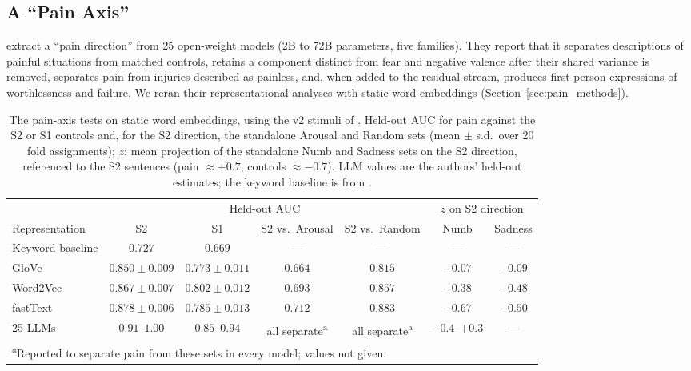 \documentclass[11pt]{article}
\begin{document}
\subsection{A ``Pain Axis''}
\label{sec:pain}

\citet{tagliabue2026pain} extract a ``pain direction'' from 25 open-weight models (2B to
72B parameters, five families). They report that it separates descriptions of painful
situations from matched controls, retains a component distinct from fear and negative valence
after their shared variance is removed, separates pain from injuries described as painless,
and, when added to the residual stream, produces first-person expressions of worthlessness
and failure. We reran their representational analyses with static word
embeddings (Section~\ref{sec:pain_methods}).

\begin{table}[t]
  \centering
  \caption{The pain-axis tests on static word embeddings, using the v2 stimuli of
  \citet{tagliabue2026pain}. Held-out AUC for pain against the S2 or S1
  controls and, for the S2 direction, the standalone Arousal and Random sets (mean $\pm$ s.d.\ over 20 fold assignments);
  $z$: mean projection of the standalone Numb and Sadness sets on the S2 direction,
  referenced to the S2 sentences (pain $\approx +0.7$, controls $\approx -0.7$). LLM values are the
  authors' held-out estimates; the keyword baseline is from \citet{painreview2026}.}
  \label{tab:pain}
  \small
  \begin{tabular}{lcccccc}
    \toprule
    & \multicolumn{4}{c}{Held-out AUC} & \multicolumn{2}{c}{$z$ on S2 direction} \\
    \cmidrule(lr){2-5} \cmidrule(lr){6-7}
    Representation & S2 & S1 & S2 vs.\ Arousal & S2 vs.\ Random & Numb & Sadness \\
    \midrule
    Keyword baseline & $0.727$ & $0.669$ & --- & --- & --- & --- \\
    GloVe    & $0.850 \pm 0.009$ & $0.773 \pm 0.011$ & $0.664$ & $0.815$ & $-0.07$ & $-0.09$ \\
    Word2Vec & $0.867 \pm 0.007$ & $0.802 \pm 0.012$ & $0.693$ & $0.857$ & $-0.38$ & $-0.48$ \\
    fastText & $0.878 \pm 0.006$ & $0.785 \pm 0.013$ & $0.712$ & $0.883$ & $-0.67$ & $-0.50$ \\
    \midrule
    25 LLMs  & $0.91$--$1.00$ & $0.85$--$0.94$ & all separate\textsuperscript{a} & all separate\textsuperscript{a} & $-0.4$--$+0.3$ & --- \\
    \bottomrule
    \multicolumn{7}{l}{\footnotesize \textsuperscript{a}Reported to separate pain from these sets in every model; values not given.}
  \end{tabular}

\end{table}
\end{document}
